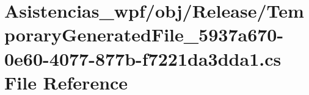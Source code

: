 \hypertarget{_asistencias__wpf_2obj_2_release_2_temporary_generated_file__5937a670-0e60-4077-877b-f7221da3dda1_8cs}{\section{Asistencias\-\_\-wpf/obj/\-Release/\-Temporary\-Generated\-File\-\_\-5937a670-\/0e60-\/4077-\/877b-\/f7221da3dda1.cs File Reference}
\label{_asistencias__wpf_2obj_2_release_2_temporary_generated_file__5937a670-0e60-4077-877b-f7221da3dda1_8cs}
}
